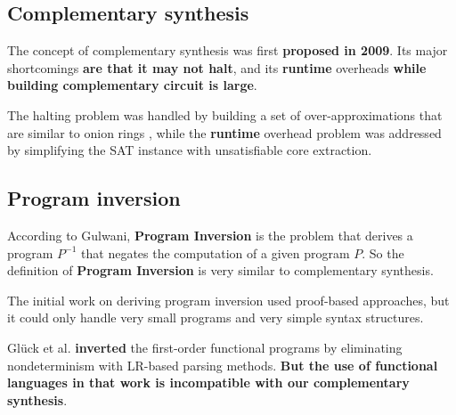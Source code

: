 \documentclass[journal]{IEEEtran}
\begin{document}
\subsection{Complementary synthesis}\label{subsec_compsyn_relat}
The concept of complementary synthesis was first \textbf{proposed in 2009}\cite{ShengYuShen:iccad09}.
Its major shortcomings \textbf{are that it may not halt},
and its \textbf{runtime} overheads \textbf{while building complementary circuit is large}.

The halting problem was handled by building a set of over-approximations that are similar to onion rings \cite{ShengYuShen:fmcad10},
while the \textbf{runtime} overhead problem was addressed by simplifying the SAT instance with unsatisfiable core extraction\cite{ShengYuShen:tcad}.

\subsection{Program inversion}\label{subsec_proinv}
According to Gulwani\cite{dim_syn},
\textbf{Program Inversion} is the problem that derives a program $P^{-1}$
that negates the computation of a given program $P$.
So the definition of \textbf{Program Inversion} is very similar to complementary synthesis.

The initial work on deriving program inversion used proof-based approaches\cite{prog_inv},
but it could only handle very small programs and very simple syntax structures.

Gl\"{u}ck et al. \cite{mtd_autoProginv} \textbf{inverted} the first-order functional programs
by eliminating nondeterminism with LR-based parsing methods.
\textbf{But the use of functional languages in that work is incompatible with our complementary synthesis}.
\end{document}
